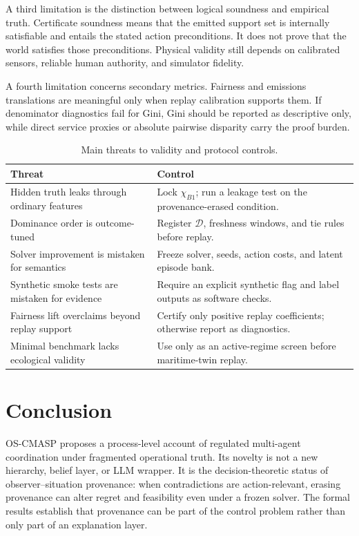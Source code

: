 \documentclass[11pt]{article}
\newcommand{\OSCMASP}{\mbox{\normalfont\textsc{OS-CMASP}}}
\newcommand{\1}{\mathbf{1}}
\theoremstyle{definition}
\theoremstyle{plain}
\theoremstyle{remark}
\begin{document}
A third limitation is the distinction between logical soundness and empirical truth. Certificate soundness means that the emitted support set is internally satisfiable and entails the stated action preconditions. It does not prove that the world satisfies those preconditions. Physical validity still depends on calibrated sensors, reliable human authority, and simulator fidelity.

A fourth limitation concerns secondary metrics. Fairness and emissions translations are meaningful only when replay calibration supports them. If denominator diagnostics fail for Gini, Gini should be reported as descriptive only, while direct service proxies or absolute pairwise disparity carry the proof burden.

\begin{table}[H]
\centering
\caption{Main threats to validity and protocol controls.}
\label{tab:threats}
\small
\begin{tabularx}{\textwidth}{@{}L{0.34\textwidth}Y@{}}
\toprule
Threat & Control \\
\midrule
Hidden truth leaks through ordinary features & Lock $\chi_{B1}$; run a leakage test on the provenance-erased condition. \\
Dominance order is outcome-tuned & Register $\mathcal D$, freshness windows, and tie rules before replay. \\
Solver improvement is mistaken for semantics & Freeze solver, seeds, action costs, and latent episode bank. \\
Synthetic smoke tests are mistaken for evidence & Require an explicit synthetic flag and label outputs as software checks. \\
Fairness lift overclaims beyond replay support & Certify only positive replay coefficients; otherwise report as diagnostics. \\
Minimal benchmark lacks ecological validity & Use only as an active-regime screen before maritime-twin replay. \\
\bottomrule
\end{tabularx}
\end{table}

\section{Conclusion}
\label{sec:conclusion}

\OSCMASP{} proposes a process-level account of regulated multi-agent coordination under fragmented operational truth. Its novelty is not a new hierarchy, belief layer, or LLM wrapper. It is the decision-theoretic status of observer--situation provenance: when contradictions are action-relevant, erasing provenance can alter regret and feasibility even under a frozen solver. The formal results establish that provenance can be part of the control problem rather than only part of an explanation layer.
\end{document}
